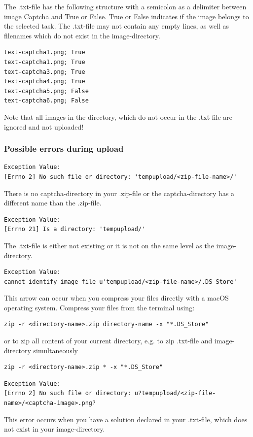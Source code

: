 The .txt-file has the following structure with a semicolon as a delimiter between image Captcha and True or False. True or False indicates if the image belongs to the selected task. The .txt-file may not contain any empty lines, as well as filenames which do not exist in the image-directory.

\begin{lstlisting}
text-captcha1.png; True
text-captcha1.png; True
text-captcha3.png; True
text-captcha4.png; True
text-captcha5.png; False
text-captcha6.png; False
\end{lstlisting}

Note that all images in the directory, which do not occur in the .txt-file are ignored and not uploaded!

\clearpage
\subsubsection{Possible errors during upload}

\begin{verbatim}
Exception Value:
[Errno 2] No such file or directory: 'tempupload/<zip-file-name>/'
\end{verbatim}
There is no captcha-directory in your .zip-file or the captcha-directory has a different name than the .zip-file.

\begin{verbatim}
Exception Value:
[Errno 21] Is a directory: 'tempupload/'
\end{verbatim}
The .txt-file is either not existing or it is not on the same level as the image-directory.

\begin{verbatim}
Exception Value:
cannot identify image file u'tempupload/<zip-file-name>/.DS_Store'
\end{verbatim}
This arrow can occur when you compress your files directly with a macOS operating system. Compress your files from the terminal using:
\begin{lstlisting}
zip -r <directory-name>.zip directory-name -x "*.DS_Store"
\end{lstlisting}
or to zip all content of your current directory, e.g. to zip .txt-file and image-directory simultaneously
\begin{lstlisting}
zip -r <directory-name>.zip * -x "*.DS_Store"
\end{lstlisting}

\begin{verbatim}
Exception Value:
[Errno 2] No such file or directory: u?tempupload/<zip-file-name>/<captcha-image>.png?
\end{verbatim}
This error occurs when you have a solution declared in your .txt-file, which does not exist in your image-directory.

